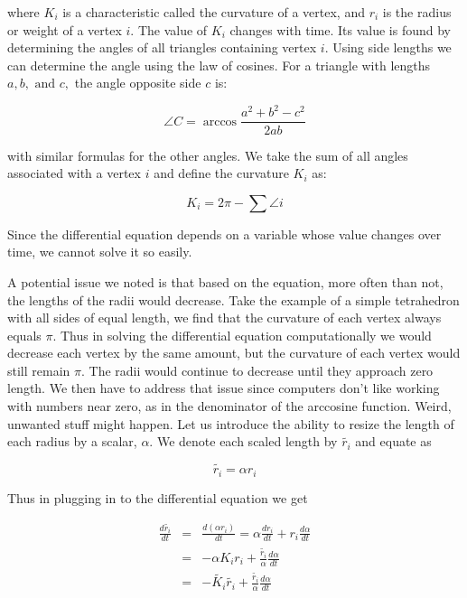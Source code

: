 \documentclass[12pt]{article}
\begin{document}
\noindent where $K_i$ is a characteristic called the curvature of a vertex, and $r_i$ is the radius or weight of a vertex $i$. The value of $K_i$ changes with time. Its value is found by determining the angles of all triangles containing vertex $i$. Using side lengths we can determine the angle using the law of cosines. For a triangle with lengths $a, b,\mbox{ and }c,$ the angle opposite side $c$ is:
  
  $$
  \angle C = \arccos\frac{a^2 + b^2 - c^2}{2ab}
  $$
  
\noindent with similar formulas for the other angles. We take the sum of all angles associated with a vertex $i$ and define the curvature $K_i$ as:

  \begin{equation}
  K_i = 2\pi - \sum{\angle i}
  \end{equation}
  
\noindent Since the differential equation depends on a variable whose value changes over time, we cannot solve it so easily.\newline
   
\noindent A potential issue we noted is that based on the equation, more often than not, the lengths of the radii would decrease. Take the example of a simple tetrahedron with all sides of equal length, we find that the curvature of each vertex always equals $\pi$. Thus in solving the differential equation computationally we would decrease each vertex by the same amount, but the curvature of each vertex would still remain $\pi$. The radii would continue to decrease until they approach zero length. We then have to address that issue since computers don't like working with numbers near zero, as in the denominator of the arccosine function. Weird, unwanted stuff might happen. Let us introduce the ability to resize the length of each radius by a scalar, $\alpha$. We denote each scaled length by $\tilde{r_i}$ and equate as
 
 \begin{equation}
 \tilde{r_i} = \alpha r_i
 \end{equation} 
 
\noindent Thus in plugging in to the differential equation we get
 
 \begin{eqnarray}
 \label{ref1}
 \frac{d\tilde{r_i}}{dt} &=& \frac{d(\alpha r_i)}{dt} = \alpha \frac{dr_i}{dt} + r_i\frac{d\alpha}{dt}\nonumber\\
 &=& -\alpha K_ir_i + \frac{\tilde{r_i}}{\alpha}\frac{d\alpha}{dt} \nonumber \\
 &=& -\tilde{K_i}\tilde{r_i} + \frac{\tilde{r_i}}{\alpha}\frac{d\alpha}{dt}
 \end{eqnarray}
 
\end{document}

